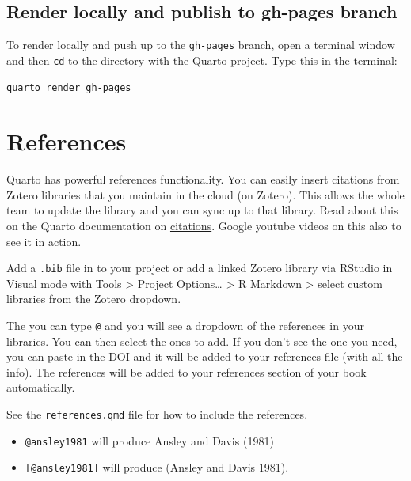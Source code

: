 \documentclass[
  letterpaper,
  oneside,
  open=any]{scrbook}
\begin{document}
\hypertarget{render-locally-and-publish-to-gh-pages-branch}{%
\section{Render locally and publish to gh-pages
branch}\label{render-locally-and-publish-to-gh-pages-branch}}

To render locally and push up to the \texttt{gh-pages} branch, open a
terminal window and then \texttt{cd} to the directory with the Quarto
project. Type this in the terminal:

\begin{verbatim}
quarto render gh-pages
\end{verbatim}


\hypertarget{references}{%
\chapter{References}\label{references}}

Quarto has powerful references functionality. You can easily insert
citations from Zotero libraries that you maintain in the cloud (on
Zotero). This allows the whole team to update the library and you can
sync up to that library. Read about this on the Quarto documentation on
\href{https://quarto.org/docs/visual-editor/technical.html\#citations}{citations}.
Google youtube videos on this also to see it in action.

Add a \texttt{.bib} file in to your project or add a linked Zotero
library via RStudio in Visual mode with Tools \textgreater{} Project
Options\ldots{} \textgreater{} R Markdown \textgreater{} select custom
libraries from the Zotero dropdown.

The you can type \texttt{@} and you will see a dropdown of the
references in your libraries. You can then select the ones to add. If
you don't see the one you need, you can paste in the DOI and it will be
added to your references file (with all the info). The references will
be added to your references section of your book automatically.

See the \texttt{references.qmd} file for how to include the references.

\begin{itemize}
\item
  \texttt{@ansley1981} will produce Ansley and Davis (1981)
\item
  \texttt{{[}@ansley1981{]}} will produce (Ansley and Davis 1981).
\end{itemize}
\end{document}
